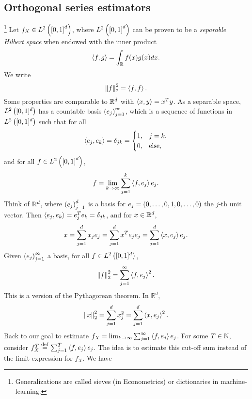 \subsection{Orthogonal series estimators}\footnote{Generalizations are called sieves (in Econometrics) or dictionaries in machine-learning.}
Let $f_X\in L^2\left(\left[0,1\right]^d\right)$, where $L^2\left(\left[0,1\right]^d\right)$ can be proven to be a \textit{separable Hilbert space} when endowed with the inner product
\begin{equation*}
  \left\langle f,g\right\rangle=\int_{\mathbb{R}} f(x)g(x) dx.
\end{equation*}
We write
\begin{equation*}
  \left\| f \right\|_2^2 = \left\langle f,f\right\rangle.
\end{equation*}
{Some properties are comparable to $\mathbb{R}^d$ with $\left\langle x,y\right\rangle = x^T y$.} As a separable space, $L^2\left([0,1]^d\right)$ has a countable basis $\left(e_j\right)_{j=1}^\infty$, which is a sequence of functions in $L^2\left([0,1]^d\right)$ such that for all
\begin{equation*}
  \left\langle e_j,e_k\right\rangle =\delta_{jk} = \begin{cases}
    1, & j=k,         \\
    0, & \text{else},
  \end{cases}
\end{equation*}
and for all $f\in L^2\left(\left[0,1\right]^d\right)$,
\begin{equation*}
  f=\lim_{k\rightarrow\infty} \sum_{j=1}^k \left\langle f,e_j\right\rangle e_j.
\end{equation*}
{Think of $\mathbb{R}^d$, where $\left(e_j\right)_{j=1}^d$ is a basis for $e_j =\left(0,\ldots,0,1,0,\ldots,0\right)$ the $j$-th unit vector. Then $\left\langle e_j,e_k\right\rangle = e_j^T e_k = \delta_{jk}$, and for $x\in \mathbb{R}^d$,
\begin{equation*}
  x = \sum_{j=1}^d x_j e_j = \sum_{j=1}^d x^T e_j e_j = \sum_{j=1}^d \left\langle x,e_j\right\rangle e_j.
\end{equation*}}
Given $\left(e_j\right)_{j=1}^\infty$ a basis, for all $f\in L^2\left([0,1]^d\right)$, \begin{equation*}
  \left\| f \right\|^2_2=\sum_{j=1}^\infty \left\langle f,e_j\right\rangle^2.
\end{equation*}
This is a version of the Pythagorean theorem. {In $\mathbb{R}^d$,
    \begin{equation*}
      \left\| x \right\|^2_2 = \sum_{j=1}^d x_j^2 = \sum_{j=1}^d \left\langle x,e_j\right\rangle^2.
    \end{equation*}}
Back to our goal to estimate $f_X = \lim_{k\rightarrow \infty}\sum_{j=1}^\infty \left\langle f,e_j\right\rangle e_j$. For some $T\in \mathbb{N}$, consider $f_X^T \overset{\mathrm{def}}{=} \sum_{j=1}^T \left\langle f,e_j\right\rangle e_j$. The idea is to estimate this cut-off sum instead of the limit expression for $f_X$. We have
